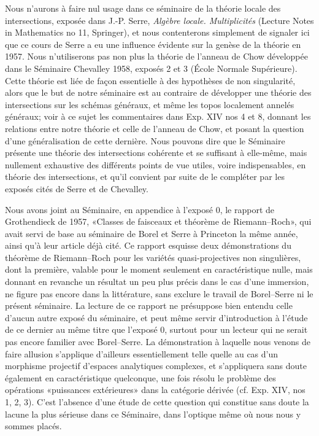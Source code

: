 \documentclass[11pt]{article}
\begin{document}
Nous n'aurons à faire nul usage dans ce séminaire de la théorie locale des intersections, exposée dans J.-P. Serre, \emph{Algèbre locale. Multiplicités} (Lecture Notes in Mathematics no 11, Springer), et nous contenterons simplement de signaler ici que ce cours de Serre a eu une influence évidente sur la genèse de la théorie en 1957. Nous n'utiliserons pas non plus la théorie de l'anneau de Chow développée dans le Séminaire Chevalley 1958, exposés 2 et 3 (École Normale Supérieure). Cette théorie est liée de façon essentielle à des hypothèses de non singularité, alors que le but de notre séminaire est au contraire de développer une théorie des intersections sur les schémas généraux, et même les topos localement annelés généraux; voir à ce sujet les commentaires dans Exp. XIV nos 4 et 8, donnant les relations entre notre théorie et celle de l'anneau de Chow, et posant la question d'une généralisation de cette dernière. Nous pouvons dire que le Séminaire présente une théorie des intersections cohérente et se suffisant à elle-même, mais nullement exhaustive des différents points de vue utiles, voire indispensables, en théorie des intersections, et qu'il convient par suite de le compléter par les exposés cités de Serre et de Chevalley.

Nous avons joint au Séminaire, en appendice à l'exposé 0, le rapport de Grothendieck de 1957, «Classes de faisceaux et théorème de Riemann--Roch», qui avait servi de base au séminaire de Borel et Serre à Princeton la même année, ainsi qu'à leur article déjà cité. Ce rapport esquisse deux démonstrations du théorème de Riemann--Roch pour les variétés quasi-projectives non singulières, dont la première, valable pour le moment seulement en caractéristique nulle, mais donnant en revanche un résultat un peu plus précis dans le cas d'une immersion, ne figure pas encore dans la littérature, sans exclure le travail de Borel--Serre ni le présent séminaire. La lecture de ce rapport ne présuppose bien entendu celle d'aucun autre exposé du séminaire, et peut même servir d'introduction à l'étude de ce dernier au même titre que l'exposé 0, surtout pour un lecteur qui ne serait pas encore familier avec Borel--Serre. La démonstration à laquelle nous venons de faire allusion s'applique d'ailleurs essentiellement telle quelle au cas d'un morphisme projectif d'espaces analytiques complexes, et s'appliquera sans doute également en caractéristique quelconque, une fois résolu le problème des opérations «puissances extérieures» dans la catégorie dérivée (cf. Exp. XIV, nos 1, 2, 3). C'est l'absence d'une étude de cette question qui constitue sans doute la lacune la plus sérieuse dans ce Séminaire, dans l'optique même où nous nous y sommes placés.
\end{document}

